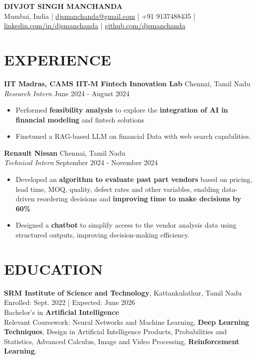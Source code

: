 \documentclass[a4paper,9pt]{extarticle}
\begin{document}
\pagestyle{empty}

\begin{center}
\textbf{\Large DIVJOT SINGH MANCHANDA}\\[5 pt] %
Mumbai, India | \href{mailto:djsmanchanda@gmail.com}{djsmanchanda@gmail.com} | +91 9137488435 | \href{https://www.linkedin.com/in/djsmanchanda}{linkedin.com/in/djsmanchanda} |  \href{https://github.com/djsmanchanda}{github.com/djsmanchanda} %
\end{center}

\section*{EXPERIENCE}
\noindent
\textbf{IIT Madras, CAMS IIT-M Fintech Innovation Lab} \hfill Chennai, Tamil Nadu\\ %
\textit{Research Intern} \hfill June 2024 - August 2024 %
\begin{itemize}
    \item Performed \textbf{feasibility analysis} to explore the \textbf{integration of AI in financial modeling} and fintech solutions
    \item Finetuned a RAG-based LLM on financial Data with web search capabilities. %
\end{itemize}

\noindent
\textbf{Renault Nissan} \hfill Chennai, Tamil Nadu\\ %
\textit{Technical Intern} \hfill September 2024 - November 2024 %
\begin{itemize}
    \item Developed an \textbf{algorithm to evaluate past part vendors} based on pricing, lead time, MOQ, quality, defect rates and other variables, enabling data-driven reordering decisions and \textbf{improving}\textbf{ time to make decisions by} \textbf{60\%}
    \item Designed a \textbf{chatbot} to simplify access to the vendor analysis data using structured outputs, improving decision-making efficiency. %
\end{itemize}

\section*{EDUCATION}
\noindent
\textbf{SRM Institute of Science and Technology}, Kattankulathur, Tamil Nadu \hfill Enrolled: Sept. 2022 | Expected: June 2026\\ %
Bachelor's in \textbf{Artificial Intelligence}\hfill \\ %
Relevant Coursework: Neural Networks and Machine Learning, \textbf{Deep Learning Techniques}, Design in Artificial Intelligence Products, Probabilities and Statistics, Advanced Calculus, Image and Video Processing, \textbf{Reinforcement Learning}.
\end{document}
